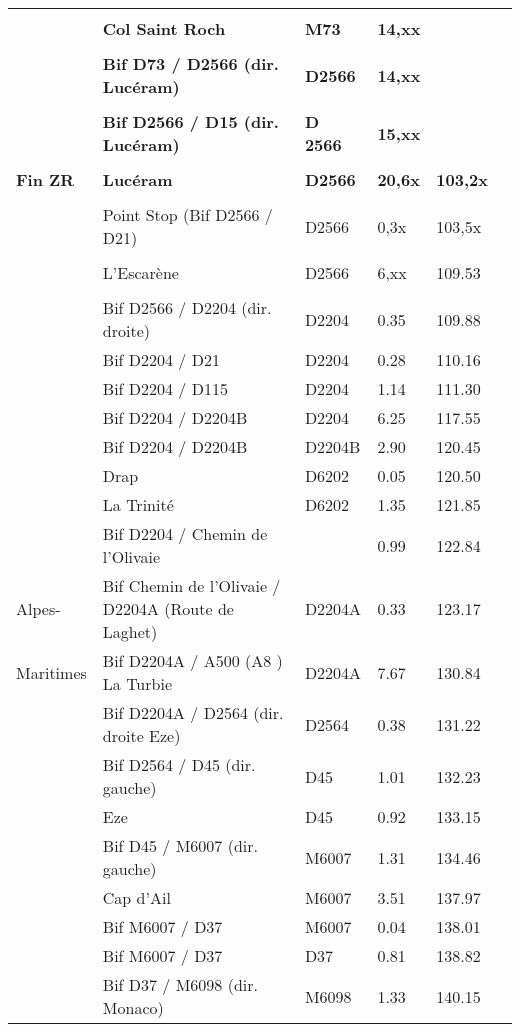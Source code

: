 \documentclass{article}%
\begin{document}
\begin{longtable}{p{2.25cm}|p{6.7cm}|p{2.0cm}|p{1.5cm}|p{1.5cm}|p{3.5cm}}
 & & & & & \\%
 &\textbf{Col Saint Roch}&\textbf{M73}&\textbf{14,xx}& & \\%
 & & & & & \\%
 &\textbf{Bif D73 / D2566 (dir. Lucéram)}&\textbf{D2566}&\textbf{14,xx}& & \\%
 & & & & & \\%
 &\textbf{Bif D2566 / D15 (dir. Lucéram)}&\textbf{D 2566 }&\textbf{15,xx}& & \\%
 & & & & & \\%
\textbf{Fin ZR}&\textbf{Lucéram}&\textbf{D2566}&\textbf{20,6x}&\textbf{103,2x}& \\%
 & & & & & \\%
 &Point Stop (Bif D2566 / D21)&D2566&0,3x&103,5x& \\%
 & & & & & \\%
 &L'Escarène&D2566&6,xx&109.53& \\%
 & & & & & \\%
 &Bif D2566 / D2204 (dir. droite)&D2204&0.35&109.88& \\%
 &Bif D2204 / D21&D2204&0.28&110.16& \\%
 &Bif D2204 / D115&D2204&1.14&111.30& \\%
 &Bif D2204 / D2204B&D2204&6.25&117.55& \\%
 &Bif D2204 / D2204B&D2204B&2.90&120.45& \\%
 &Drap&D6202&0.05&120.50& \\%
 &La Trinité&D6202&1.35&121.85& \\%
 &Bif D2204 / Chemin de l'Olivaie& &0.99&122.84& \\%
Alpes-&Bif Chemin de l'Olivaie / D2204A (Route de Laghet)&D2204A&0.33&123.17& \\%
Maritimes&Bif D2204A / A500 (A8 ) La Turbie&D2204A&7.67&130.84& \\%
 &Bif D2204A / D2564 (dir. droite Eze)&D2564&0.38&131.22& \\%
 &Bif D2564 / D45 (dir. gauche)&D45&1.01&132.23& \\%
 &Eze &D45&0.92&133.15& \\%
 &Bif D45 / M6007 (dir. gauche)&M6007 &1.31&134.46& \\%
 &Cap d'Ail &M6007&3.51&137.97& \\%
 &Bif M6007 / D37&M6007&0.04&138.01& \\%
 &Bif M6007 / D37&D37&0.81&138.82& \\%
 &Bif D37 / M6098 (dir. Monaco)&M6098&1.33&140.15& \\%

\end{longtable}
\end{document}
